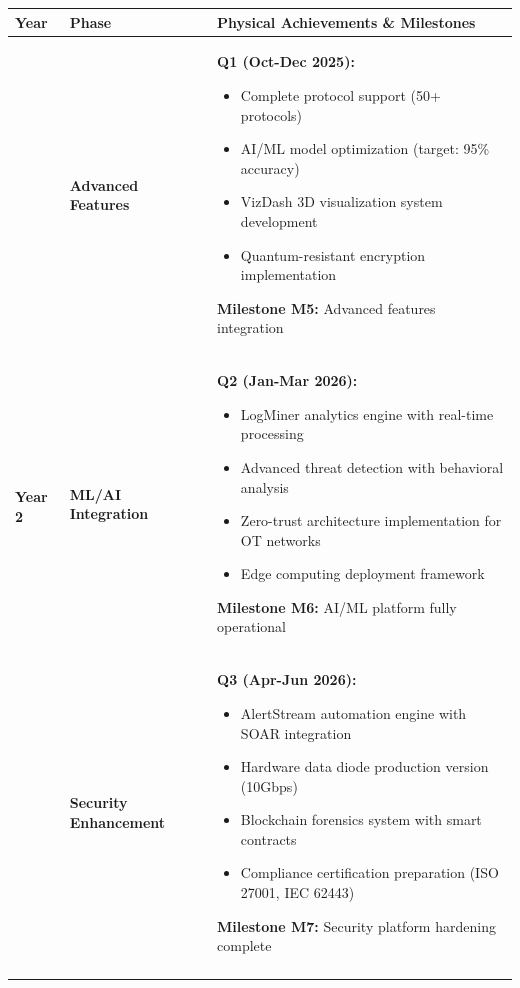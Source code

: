 \documentclass[12pt,a4paper]{article}
\begin{document}
\begin{longtable}{|p{2cm}|p{4cm}|p{8.5cm}|}
\hline
\rowcolor{lightblue}
\textbf{Year} & \textbf{Phase} & \textbf{Physical Achievements \& Milestones} \\
\hline
\endhead

\multirow{8}{*}{\textbf{Year 2}} & \textbf{Advanced Features} & 
\textbf{Q1 (Oct-Dec 2025):}
\begin{itemize}[leftmargin=1em, itemsep=0pt]
    \item Complete protocol support (50+ protocols)
    \item AI/ML model optimization (target: 95\% accuracy)
    \item VizDash 3D visualization system development
    \item Quantum-resistant encryption implementation
\end{itemize}

\textbf{Milestone M5:} Advanced features integration \\
\cline{2-3}

& \textbf{ML/AI Integration} & 
\textbf{Q2 (Jan-Mar 2026):}
\begin{itemize}[leftmargin=1em, itemsep=0pt]
    \item LogMiner analytics engine with real-time processing
    \item Advanced threat detection with behavioral analysis
    \item Zero-trust architecture implementation for OT networks
    \item Edge computing deployment framework
\end{itemize}

\textbf{Milestone M6:} AI/ML platform fully operational \\
\cline{2-3}

& \textbf{Security Enhancement} & 
\textbf{Q3 (Apr-Jun 2026):}
\begin{itemize}[leftmargin=1em, itemsep=0pt]
    \item AlertStream automation engine with SOAR integration
    \item Hardware data diode production version (10Gbps)
    \item Blockchain forensics system with smart contracts
    \item Compliance certification preparation (ISO 27001, IEC 62443)
\end{itemize}

\textbf{Milestone M7:} Security platform hardening complete \\
\cline{2-3}


\end{longtable}
\end{document}

